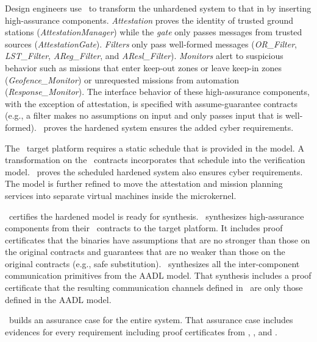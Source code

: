 Design engineers use \briefcase\ to transform the unhardened system to that in
 by inserting high-assurance components.
\emph{Attestation} proves the identity of trusted ground stations (\emph{AttestationManager}) while
the \emph{gate} only passes messages from trusted sources (\emph{AttestationGate}).
\emph{Filters} only pass well-formed messages (\emph{OR\_Filter}, \emph{LST\_Filter},
\emph{AReg\_Filter}, and \emph{AResl\_Filter}).
\emph{Monitors} alert to suspicious behavior such as missions that enter keep-out zones or leave
keep-in zones (\emph{Geofence\_Monitor}) or unrequested missions from automation
(\emph{Response\_Monitor}).
The interface behavior of these high-assurance components, with the exception of attestation, is
specified with assume-guarantee contracts (e.g., a filter makes no assumptions on input and only
passes input that is well-formed).
\agree\ proves the hardened system ensures the added cyber requirements.

The \selFour\ target platform requires a static schedule that is provided in the model.
A transformation on the \agree\ contracts incorporates that schedule into the verification model.
\agree\ proves the scheduled hardened system also ensures cyber requirements.
The model is further refined to move the attestation and mission planning services into separate
virtual machines inside the microkernel.

\resolint\ certifies the hardened model is ready for synthesis.
\splat\ synthesizes high-assurance components from their \agree\ contracts to the target platform.
It includes proof certificates that the binaries have assumptions that are no stronger than those on
the original contracts and guarantees that are no weaker than those on the original contracts (e.g.,
safe substitution).
\hamr\ synthesizes all the inter-component communication primitives from the AADL model.
That synthesis includes a proof certificate that the resulting communication channels defined in
\selFour\ are only those defined in the AADL model.

\resolute\ builds an assurance case for the entire system.
That assurance case includes evidences for every requirement including proof certificates from
\agree, \splat, and \hamr.
